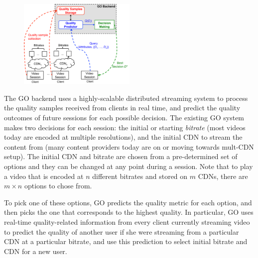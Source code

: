 \begin{figure}[h!]
\centering
 \includegraphics[width=0.5\textwidth] {figures/go-overview.pdf}
\label{fig:go-overview}
\end{figure}
 
The GO backend uses a highly-scalable distributed streaming system to
process the quality samples received from clients in real time, and
predict the quality outcomes of future sessions for each possible
decision.  The existing GO system makes two decisions for each
session: the initial or starting {\it bitrate} (most videos today are
encoded at multiple resolutions), and the initial CDN to stream the
content from (many content providers today are on or moving towards
mult-CDN setup). The initial CDN and bitrate are chosen from a
pre-determined set of options and they can be changed at any point
during a session. Note that to play a video that is encoded at $n$
different bitrates and stored on $m$ CDNs, there are $m\times n$
options to chose from.

To pick one of these options, GO predicts the quality metric for each
option, and then picks the one that corresponds to the highest
quality. In particular, GO uses real-time quality-related information
from every client currently streaming video to predict the quality of
another user if she were streaming from a particular CDN at a
particular bitrate, and use this prediction to select initial bitrate
and CDN for a new user.




